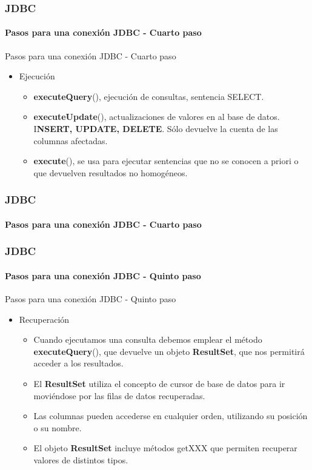 \documentclass{beamer}
\begin{document}
	\begin{frame}
		\frametitle{JDBC}
		\framesubtitle{Pasos para una conexi\'on JDBC - Cuarto paso}

        \begin{exampleblock}{Pasos para una conexi\'on JDBC - Cuarto paso}
		    \begin{itemize}
		        \item Ejecuci\'on
		        \begin{itemize}
		            \item \textbf{executeQuery}(), ejecuci\'on de consultas, sentencia SELECT.
		            \item \textbf{executeUpdate}(), actualizaciones de valores en al base de datos. I\textbf{NSERT, UPDATE, DELETE}. S\'olo devuelve la cuenta de las columnas afectadas.
		            \item \textbf{execute}(), se usa para ejecutar sentencias que no se conocen a priori o que devuelven resultados no homog\'eneos.
		        \end{itemize}
		    \end{itemize}
		    \end{exampleblock}
	\end{frame}

    \begin{frame}
		\frametitle{JDBC}
		\framesubtitle{Pasos para una conexi\'on JDBC - Cuarto paso}

        
	\end{frame}

	\begin{frame}
		\frametitle{JDBC}
		\framesubtitle{Pasos para una conexi\'on JDBC - Quinto paso}

        \begin{exampleblock}{Pasos para una conexi\'on JDBC - Quinto paso}
		    \begin{itemize}
		        \item Recuperaci\'on
		        \begin{itemize}
		            \item Cuando ejecutamos una consulta debemos emplear el m\'etodo \textbf{executeQuery}(), que devuelve un objeto \textbf{ResultSet}, que nos permitir\'a acceder a los resultados.
		            \item El \textbf{ResultSet} utiliza el concepto de cursor de base de datos para ir movi\'endose por las filas de datos recuperadas.
		            \item Las columnas pueden accederse en cualquier orden, utilizando su posici\'on o su nombre.
		            \item El objeto \textbf{ResultSet} incluye m\'etodos getXXX que permiten recuperar valores de distintos tipos.
		        \end{itemize}
		    \end{itemize}
		    \end{exampleblock}
	\end{frame}
\end{document}
